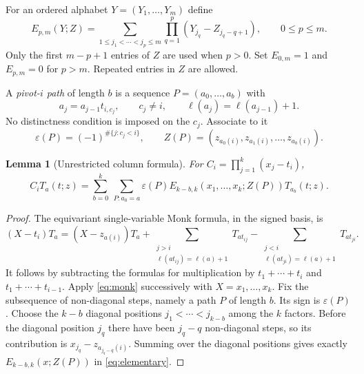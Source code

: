 \documentclass{amsart}
\newtheorem{lemma}[theorem]{Lemma}
\theoremstyle{definition}
\theoremstyle{remark}
\numberwithin{equation}{section}
\begin{document}
For an ordered alphabet $Y=(Y_1,\ldots,Y_m)$ define
\begin{equation}\label{eq:elementary}
 E_{p,m}(Y;Z)=
 \sum_{1\leq j_1<\cdots<j_p\leq m}
       \prod_{q=1}^p (Y_{j_q}-Z_{j_q-q+1}),
 \qquad 0\leq p\leq m .
\end{equation}
Only the first $m-p+1$ entries of $Z$ are used when $p>0$.
Set $E_{0,m}=1$ and $E_{p,m}=0$ for $p>m$.
Repeated entries in $Z$ are allowed.

A \emph{pivot-$i$ path} of length $b$ is a sequence
$P=(a_0,\ldots,a_b)$ with
\[
 a_j=a_{j-1}t_{i,c_j},\qquad c_j\ne i,\qquad
 \ell(a_j)=\ell(a_{j-1})+1.
\]
No distinctness condition is imposed on the $c_j$.
Associate to it
\[
 \varepsilon(P)=(-1)^{\#\{j:c_j<i\}},\qquad
 Z(P)=(z_{a_0(i)},z_{a_1(i)},\ldots,z_{a_b(i)}).
\]

\begin{lemma}[Unrestricted column formula]\label{lem:column}
For $C_i=\prod_{j=1}^k(x_j-t_i)$,
\begin{equation}\label{eq:column}
 C_i T_a(t;z)=
 \sum_{b=0}^k\ \sum_{P:a_0=a}
   \varepsilon(P)E_{k-b,k}(x_1,\ldots,x_k;Z(P))T_{a_b}(t;z).
\end{equation}
\end{lemma}
\begin{proof}
The equivariant single-variable Monk formula, in the signed basis, is
\begin{equation}\label{eq:monk}
 (X-t_i)T_a=(X-z_{a(i)})T_a
   +\sum_{\substack{j>i\\ \ell(at_{ij})=\ell(a)+1}}T_{at_{ij}}
   -\sum_{\substack{j<i\\ \ell(at_{ji})=\ell(a)+1}}T_{at_{ji}} .
\end{equation}
It follows by subtracting the formulas for multiplication by
$t_1+\cdots+t_i$ and $t_1+\cdots+t_{i-1}$.
Apply \eqref{eq:monk} successively with $X=x_1,\ldots,x_k$.
Fix the subsequence of non-diagonal steps, namely a path $P$ of length $b$.
Its sign is $\varepsilon(P)$.
Choose the $k-b$ diagonal positions
$j_1<\cdots<j_{k-b}$ among the $k$ factors.
Before the diagonal position $j_q$ there have been $j_q-q$
non-diagonal steps, so its contribution is
$x_{j_q}-z_{a_{j_q-q}(i)}$.
Summing over the diagonal positions gives exactly
$E_{k-b,k}(x;Z(P))$ in \eqref{eq:elementary}.
\end{proof}
\end{document}
